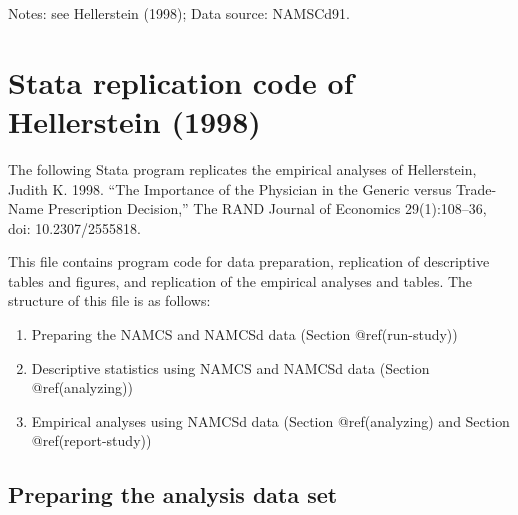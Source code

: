 \documentclass[
]{book}
\providecommand{\tightlist}{%
  \setlength{\itemsep}{0pt}\setlength{\parskip}{0pt}}
\begin{document}
Notes: see Hellerstein (1998); Data source: NAMSCd91.

\hypertarget{stata-replication-code-of-hellerstein-1998}{%
\chapter{Stata replication code of Hellerstein
(1998)}\label{stata-replication-code-of-hellerstein-1998}}

The following Stata program replicates the empirical analyses of
Hellerstein, Judith K. 1998. ``The Importance of the Physician in the
Generic versus Trade-Name Prescription Decision,'' The RAND Journal of
Economics 29(1):108--36, doi: 10.2307/2555818.

This file contains program code for data preparation, replication of
descriptive tables and figures, and replication of the empirical
analyses and tables. The structure of this file is as follows:

\begin{enumerate}
\def\labelenumi{\arabic{enumi}.}
\tightlist
\item
  Preparing the NAMCS and NAMCSd data (Section @ref(run-study))
\item
  Descriptive statistics using NAMCS and NAMCSd data (Section
  @ref(analyzing))
\item
  Empirical analyses using NAMCSd data (Section @ref(analyzing) and
  Section @ref(report-study))
\end{enumerate}

\hypertarget{A1}{%
\section{Preparing the analysis data set}\label{A1}}
\end{document}
